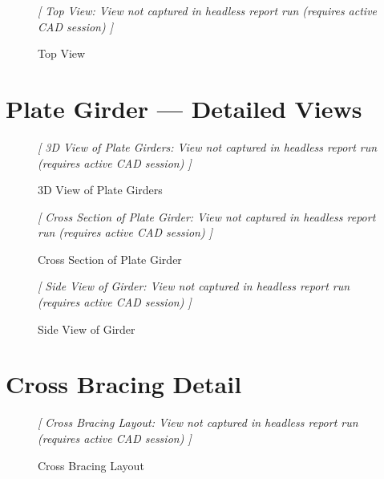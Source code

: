 \documentclass[12pt,a4paper]{report}
\numberwithin{table}{chapter}
\numberwithin{figure}{chapter}
\begin{document}
\begin{figure}[H]
\centering
\vspace{6pt}
{\small\itshape [ Top View: View not captured in headless report run (requires active CAD session) ]}
\vspace{6pt}
\caption{Top View}
\label{fig:top-view}
\end{figure}


\section{Plate Girder --- Detailed Views}
\label{sec:girder-views}

\begin{figure}[H]
\centering
\vspace{6pt}
{\small\itshape [ 3D View of Plate Girders: View not captured in headless report run (requires active CAD session) ]}
\vspace{6pt}
\caption{3D View of Plate Girders}
\label{fig:girder-3d}
\end{figure}


\begin{figure}[H]
\centering
\vspace{6pt}
{\small\itshape [ Cross Section of Plate Girder: View not captured in headless report run (requires active CAD session) ]}
\vspace{6pt}
\caption{Cross Section of Plate Girder}
\label{fig:girder-xsec}
\end{figure}


\begin{figure}[H]
\centering
\vspace{6pt}
{\small\itshape [ Side View of Girder: View not captured in headless report run (requires active CAD session) ]}
\vspace{6pt}
\caption{Side View of Girder}
\label{fig:girder-side}
\end{figure}


\section{Cross Bracing Detail}
\label{sec:bracing-detail}

\begin{figure}[H]
\centering
\vspace{6pt}
{\small\itshape [ Cross Bracing Layout: View not captured in headless report run (requires active CAD session) ]}
\vspace{6pt}
\caption{Cross Bracing Layout}
\label{fig:cb-layout}
\end{figure}
\end{document}

